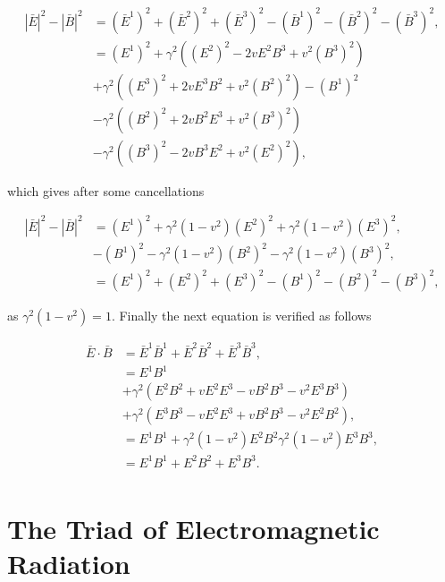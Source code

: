 \begin{appendix}
\begin{align*} 
{|\bar{E}|}^2 - {|\bar{B}|}^2 & = {(\bar{E}^1)}^2 + {(\bar{E}^2)}^2 + {(\bar{E}^3)}^2 - {(\bar{B}^1)}^2 - {(\bar{B}^2)}^2 - {(\bar{B}^3)}^2,\\
                              & = (E^1)^2 + \gamma^2 ((E^2)^2 - 2vE^2B^3 + v^2 (B^3)^2) \\
                              & + \gamma^2 ((E^3)^2 + 2vE^3 B^2 + v^2 (B^2)^2) - (B^1)^2 \\
                              & - \gamma^2 ((B^2)^2 + 2vB^2E^3 + v^2 (B^3)^2) \\
                              & - \gamma^2 ((B^3)^2 - 2vB^3E^2 + v^2 (E^2)^2),
\end{align*}

\noindent which gives after some cancellations

\begin{align*}
{|\bar{E}|}^2 - {|\bar{B}|}^2 & = (E^1)^2 + \gamma^2 (1-v^2)(E^2)^2 + \gamma^2 (1-v^2)(E^3)^2, \\
                              & - (B^1)^2 - \gamma^2 (1-v^2)(B^2)^2 - \gamma^2 (1-v^2)(B^3)^2, \\
                              & = {({E}^1)}^2 + {({E}^2)}^2 + {({E}^3)}^2 - {({B}^1)}^2 - {({B}^2)}^2 - {({B}^3)}^2,
\end{align*}

\noindent as $\gamma^2 (1-v^2) = 1$. Finally the next equation is verified as follows

\begin{align*}
\bar{E} \cdot \bar{B} & = \bar{E}^1\bar{B}^1 + \bar{E}^2\bar{B}^2 + \bar{E}^3\bar{B}^3, \\
                      & = E^1B^1 \\
                      & + \gamma^2 (E^2B^2 + vE^2E^3 - vB^2B^3 - v^2E^3B^3) \\
                      & + \gamma^2 (E^3B^3 - vE^2E^3 + vB^2B^3 - v^2 E^2B^2), \\
                      & = E^1B^1 + \gamma^2 (1-v^2)E^2B^2 \gamma^2 (1-v^2)E^3B^3,\\ 
                      & = {E}^1{B}^1 + {E}^2{B}^2 + {E}^3{B}^3. \\
\end{align*}

\section{The Triad of Electromagnetic Radiation}\label{Appendix_Orthonormal_Triad}


\end{appendix}
